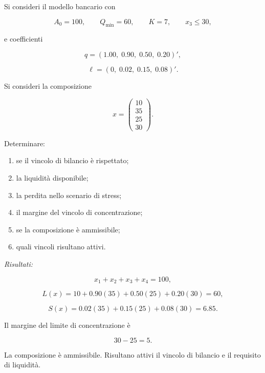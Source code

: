 \begin{exercise}

\label{ex:cap11-proposto-ammissibilita}

Si consideri il modello bancario con

\[
A_0=100,
\qquad
Q_{\min}=60,
\qquad
K=7,
\qquad
x_3\leq30,
\]

\noindent e coefficienti

\[
q=(1.00,\;0.90,\;0.50,\;0.20)',
\]

\[
\ell=(0,\;0.02,\;0.15,\;0.08)'.
\]

Si consideri la composizione

\[
x=
\begin{pmatrix}
10\\
35\\
25\\
30
\end{pmatrix}.
\]

Determinare:

\begin{enumerate}

\item se il vincolo di bilancio \`e rispettato;

\item la liquidit\`a disponibile;

\item la perdita nello scenario di stress;

\item il margine del vincolo di concentrazione;

\item se la composizione \`e ammissibile;

\item quali vincoli risultano attivi.

\end{enumerate}

\end{exercise}

\noindent
\textit{Risultati:}

\[
x_1+x_2+x_3+x_4=100,
\]

\[
L(x)
=
10+0.90(35)+0.50(25)+0.20(30)
=
60,
\]

\[
S(x)
=
0.02(35)+0.15(25)+0.08(30)
=
6.85.
\]

Il margine del limite di concentrazione \`e

\[
30-25=5.
\]

La composizione \`e ammissibile. Risultano attivi il vincolo di bilancio e
il requisito di liquidit\`a.


